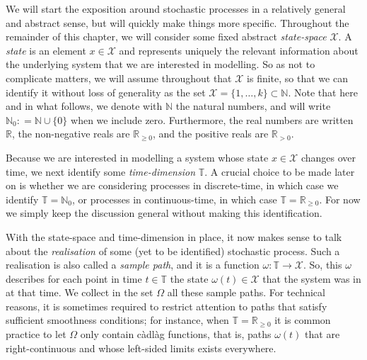 \documentclass[graybox]{svmult}
\newcommand{\nats}{\mathbb{N}}
\newcommand{\natswith}{\nats_{0}}
\newcommand{\reals}{\mathbb{R}}
\newcommand{\realspos}{\reals_{>0}}
\newcommand{\realsnonneg}{\reals_{\geq 0}}
\newcommand{\states}{\mathcal{X}}
\newcommand{\coloneqq}{:\!=}
\newcommand{\timedim}{\mathbb{T}}
\begin{document}
We will start the exposition around stochastic processes in a relatively general and abstract sense, but will quickly make things more specific. Throughout the remainder of this chapter, we will consider some fixed abstract \emph{state-space} $\states$. A \emph{state} is an element $x\in\states$ and represents uniquely the relevant information about the underlying system that we are interested in modelling. So as not to complicate matters, we will assume throughout that $\states$ is finite, so that we can identify it without loss of generality as the set $\states=\{1,\ldots,k\}\subset\nats$. Note that here and in what follows, we denote with $\nats$ the natural numbers, and will write $\natswith\coloneqq\nats\cup\{0\}$ when we include zero. Furthermore, the real numbers are written $\reals$, the non-negative reals are $\realsnonneg$, and the positive reals are $\realspos$.

Because we are interested in modelling a system whose state $x\in\states$ changes over time, we next identify some \emph{time-dimension} $\timedim$. A crucial choice to be made later on is whether we are considering processes in discrete-time, in which case we identify $\timedim=\natswith$, or processes in continuous-time, in which case $\timedim=\realsnonneg$. For now we simply keep the discussion general without making this identification.

With the state-space and time-dimension in place, it now makes sense to talk about the \emph{realisation} of some (yet to be identified) stochastic process. Such a realisation is also called a \emph{sample path}, and it is a function $\omega:\timedim\to\states$. So, this $\omega$ describes for each point in time $t\in\timedim$ the state $\omega(t)\in\states$ that the system was in at that time. We collect in the set $\Omega$ all these sample paths. For technical reasons, it is sometimes required to restrict attention to paths that satisfy sufficient smoothness conditions; for instance, when $\timedim=\realsnonneg$ it is common practice to let $\Omega$ only contain c\`adl\`ag functions, that is, paths $\omega(t)$ that are right-continuous and whose left-sided limits exists everywhere.
\end{document}
